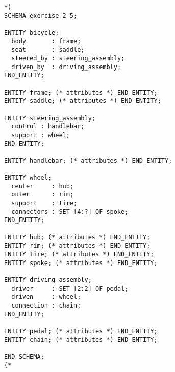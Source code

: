 \documentclass{article}
\newenvironment{code}{}{}
\begin{document}
\begin{code}
\begin{verbatim}
*)
SCHEMA exercise_2_5;

ENTITY bicycle;
  body       : frame;
  seat       : saddle;
  steered_by : steering_assembly;
  driven_by  : driving_assembly;
END_ENTITY;

ENTITY frame; (* attributes *) END_ENTITY;
ENTITY saddle; (* attributes *) END_ENTITY;

ENTITY steering_assembly;
  control : handlebar;
  support : wheel;
END_ENTITY;

ENTITY handlebar; (* attributes *) END_ENTITY;

ENTITY wheel;
  center     : hub;
  outer      : rim;
  support    : tire;
  connectors : SET [4:?] OF spoke;
END_ENTITY;

ENTITY hub; (* attributes *) END_ENTITY;
ENTITY rim; (* attributes *) END_ENTITY;
ENTITY tire; (* attributes *) END_ENTITY;
ENTITY spoke; (* attributes *) END_ENTITY;

ENTITY driving_assembly;
  driver     : SET [2:2] OF pedal;
  driven     : wheel;
  connection : chain;
END_ENTITY;

ENTITY pedal; (* attributes *) END_ENTITY;
ENTITY chain; (* attributes *) END_ENTITY;

END_SCHEMA;
(*
\end{verbatim}
\end{code}
\end{document}
